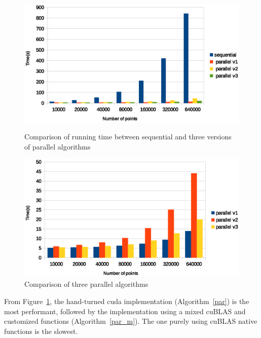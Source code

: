 \begin{figure}[!h]
  \centering
  \begin{minipage}{.8\textwidth}
    \includegraphics[width=\linewidth]{fig/all_comparison}
    \caption{Comparison of running time between sequential and three versions of parallel algorithms}
    \label{fig:all}
  \end{minipage}
  \begin{minipage}{.8\textwidth}
    \includegraphics[width=\linewidth]{fig/parallel_algorithm_comparison}
    \caption{Comparison of three parallel algorithms}
    \label{fig:par}
  \end{minipage}
\end{figure}

From Figure~\ref{fig:par}, the hand-turned cuda implementation (Algorithm~\ref{par})
is the most performant, followed by the implementation using a mixed cuBLAS and 
customized functions (Algorithm~\ref{par_m}).
The one purely using cuBLAS native functions is the slowest.
